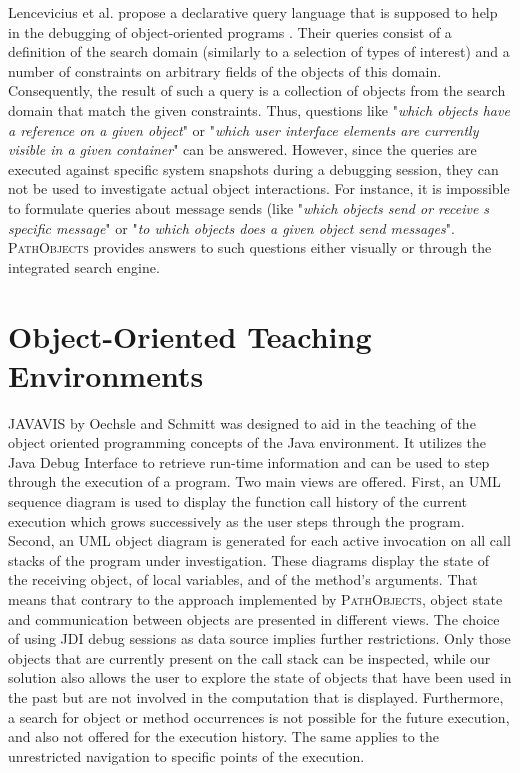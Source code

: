 Lencevicius et al. propose a declarative query language that is supposed to help in the debugging of object-oriented programs \cite{lencevicius_query-based_1997, guerraoui_dynamic_1999}.
Their queries consist of a definition of the search domain (similarly to a selection of types of interest) and a number of constraints on arbitrary fields of the objects of this domain.
Consequently, the result of such a query is a collection of objects from the search domain that match the given constraints.
Thus, questions like "\textit{which objects have a reference on a given object}" or "\textit{which user interface elements are currently visible in a given container}" can be answered.
However, since the queries are executed against specific system snapshots during a debugging session, they can not be used to investigate actual object interactions.
For instance, it is impossible to formulate queries about message sends (like "\textit{which objects send or receive s specific message}" or "\textit{to which objects does a given object send messages}".
\textsc{PathObjects} provides answers to such questions either visually or through the integrated search engine.

\section{Object-Oriented Teaching Environments}
\textsc{JAVAVIS} by Oechsle and Schmitt \cite{diehl_javavis:_2002} was designed to aid in the teaching of the object oriented programming concepts of the Java environment.
It utilizes the Java Debug Interface to retrieve run-time information and can be used to step through the execution of a program.
Two main views are offered.
First, an UML sequence diagram is used to display the function call history of the current execution which grows successively as the user steps through the program.
Second, an UML object diagram is generated for each active invocation on all call stacks of the program under investigation.
These diagrams display the state of the receiving object, of local variables, and of the method's arguments.
That means that contrary to the approach implemented by \textsc{PathObjects}, object state and communication between objects are presented in different views.
The choice of using JDI debug sessions as data source implies further restrictions.
Only those objects that are currently present on the call stack can be inspected, while our solution also allows the user to explore the state of objects that have been used in the past but are not involved in the computation that is displayed.
Furthermore, a search for object or method occurrences is not possible for the future execution, and also not offered for the execution history.
The same applies to the unrestricted navigation to specific points of the execution.

